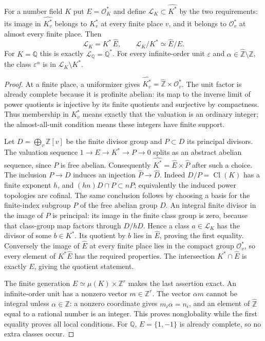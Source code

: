 \begin{proposition}
\label{F-local-global-units}
For a number field $K$ put $E=\mathcal O_K^*$ and define
$\mathcal L_K\subset\widehat{K^*}$ by the two requirements:
its image in $\widehat{K_v^*}$ belongs to $K_v^*$ at every finite
place $v$, and it belongs to $\mathcal O_v^*$ at almost every
finite place. Then
\[
 \mathcal L_K=K^*\,\widehat E,\qquad
 \mathcal L_K/K^*\simeq\widehat E/E.                          \tag{F.4}
\]
For $K=\mathbb Q$ this is exactly $\mathcal L_{\mathbb Q}=\mathbb Q^*$.
For every infinite-order unit $\varepsilon$ and
$\alpha\in\widehat{\mathbb Z}\setminus\mathbb Z$, the class
$\varepsilon^\alpha$ is in $\mathcal L_K\setminus K^*$.
\end{proposition}
\begin{proof}
At a finite place, a uniformizer gives
$\widehat{K_v^*}=\widehat{\mathbb Z}\times\mathcal O_v^*$.
The unit factor is already complete because it is profinite
abelian: its map to the inverse limit of power quotients is
injective by its finite quotients and surjective by compactness.
Thus membership in $K_v^*$ means exactly that the valuation is
an ordinary integer; the almost-all-unit condition means these
integers have finite support.

Let $D=\bigoplus_v\mathbb Z[v]$ be the finite divisor group and
$P\subset D$ its principal divisors. The valuation sequence
$1\to E\to K^*\to P\to0$ splits as an abstract abelian sequence,
since $P$ is free abelian. Consequently
$\widehat{K^*}=\widehat E\times\widehat P$ after such a choice.
The inclusion $P\to D$ induces an injection
$\widehat P\to\widehat D$. Indeed $D/P=\operatorname{Cl}(K)$
has a finite exponent $h$, and
$(hn)D\cap P\subset nP$; equivalently the induced power
topologies are cofinal. The same conclusion follows by choosing
a basis for the finite-index subgroup $P$ of the free abelian
group $D$. An integral finite divisor in the image of
$\widehat P$ is principal: its image in the finite class group
is zero, because that class-group map factors through $D/hD$.
Hence a class $a\in\mathcal L_K$ has the divisor of some
$b\in K^*$. Its quotient by $b$ lies in $\widehat E$, proving
the first equality. Conversely the image of $\widehat E$ at
every finite place lies in the compact group $\mathcal O_v^*$,
so every element of $K^*\widehat E$ has the required properties.
The intersection $K^*\cap\widehat E$ is exactly $E$, giving
the quotient statement.

The finite generation $E\simeq\mu(K)\times\mathbb Z^r$
makes the last assertion exact. An infinite-order unit has a
nonzero vector $m\in\mathbb Z^r$. The vector $\alpha m$
cannot be integral unless $\alpha\in\mathbb Z$: a nonzero
coordinate gives $m_i\alpha=n_i$, and an element of
$\widehat{\mathbb Z}$ equal to a rational number is an integer.
This proves nonglobality while the first equality proves all
local conditions. For $\mathbb Q$, $E=\{1,-1\}$ is already
complete, so no extra classes occur.
\end{proof}

